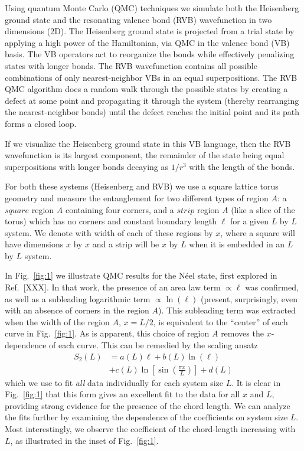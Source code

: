\documentclass[prl,aps,twocolumn,floatfix,amsmath,amssymb,superscriptaddress,tightenlines]{revtex4}
\begin{document}
Using quantum Monte Carlo (QMC) techniques we simulate both the
Heisenberg ground state and the resonating valence bond (RVB)
wavefunction in two dimensions (2D).  The Heisenberg ground state is
projected from a trial state by applying a high power of the
Hamiltonian, via QMC in the valence bond (VB)
basis.\cite{Sandvik_VBQMC} The VB operators act to reorganize the
bonds while effectively penalizing states with longer bonds.  The RVB
wavefunction contains all possible combinations of only
nearest-neighbor VBs in an equal superpositions.  The RVB QMC
algorithm does a random walk through the possible states by creating a
defect at some point and propagating it through the system (thereby
rearranging the nearest-neighbor bonds) until the defect reaches the
initial point and its path forms a closed loop.

If we visualize the Heisenberg ground state in this VB language, then the RVB wavefunction is its largest component, the remainder of the state being equal superpositions with longer bonds decaying as $1/r^3$ \cite{Sandvik_VB_decay} with the length of the bonds.

For both these systems (Heisenberg and RVB) we use a square lattice torus geometry and measure the entanglement for two different types of region $A$:
a $square$ region $A$ containing four corners, and a $strip$ region $A$ (like a slice of the torus) which has no corners and constant boundary length $\ell$ for a given $L$ by $L$ system.
We denote with width of each of these regions by $x$, where a square will have dimensions $x$ by $x$ and a strip will be $x$ by $L$ when it is embedded in an $L$ by $L$ system.

In Fig.~{\ref{fig:1}} we illustrate QMC results for the N\'eel state, first explored in Ref.~[XXX].  In that work, the presence of an area law term $\propto \ell$ was confirmed, as well as a subleading logarithmic term $\propto \ln(\ell)$ (present, surprisingly, even with an absence of corners in the region $A$).  This subleading term was extracted when the width of the region $A$, $x = L/2$, is equivalent to the ``center'' of each curve in Fig.~{\ref{fig:1}}.  As is apparent, this choice of region $A$ removes the $x$-dependence of each curve.  This can be remedied
by the scaling ansatz
\begin{align}
S_2(L) &= a(L) \ell + b(L) \ln(\ell) \nonumber \\
&+ c(L) \ln \left[{ \sin\left({ \frac{\pi x}{L} }\right) }\right] + d(L) \label{Fit}
\end{align}
{\color{red} which we use to fit {\it all} data individually for each system size $L$. }
It is clear in Fig.~{\ref{fig:1}} that this form gives an excellent fit to the data for all $x$ and $L$, providing strong evidence for the presence of the chord length.  We can analyze the fits further by examining the dependence of the coefficients on system size $L$.  Most interestingly, we observe the coefficient of the chord-length increasing with $L$, as illustrated in the inset of Fig.~{\ref{fig:1}}.
\end{document}
